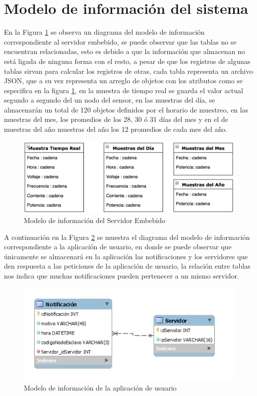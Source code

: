 \section{Modelo de información del sistema}
En la Figura \ref{fig:Base_ServidorEmbebido} se observa un diagrama del modelo de información correspondiente al servidor embebido, se puede observar que las tablas no se encuentran relacionadas, esto es debido a que la información que almacenan no está ligada de ninguna forma con el resto, a pesar de que los registros de algunas tablas sirvan para calcular los registros de otras, cada tabla representa un archivo JSON, que a su vez representa un arreglo de objetos con los atributos como se especifica en la figura \ref{fig:Base_ServidorEmbebido}, en la muestra de tiempo real se guarda el valor actual segundo a segundo del un nodo del sensor, en las muestras del día, se almacenarán un total de 120 objetos definidos por el horario de muestreo, en las muestras del mes, los promedios de los 28, 30 ó 31 días del mes y en el de muestras del año muestras del año los 12 promedios de cada mes del año.

\begin{figure}[H]
	\centering
	\includegraphics[scale=.35]{Capitulo4/images/Base_ServidorEmbebido.png}
	\caption{Modelo de información del Servidor Embebido}
	\label{fig:Base_ServidorEmbebido}
\end{figure}

A continuación en la Figura \ref{fig:Base_AplicacionUsuario} se muestra el diagrama del modelo de información correspondiente a la aplicación de usuario, en donde se puede observar que únicamente se almacenará en la aplicación las notificaciones y los servidores que den respuesta a las peticiones de la aplicación de usuario, la relación entre tablas nos indica que muchas notificaciones pueden pertenecer a un mismo servidor.

\begin{figure}[H]
	\centering
	\includegraphics[scale=1]{Capitulo4/images/Base_AplicacionUsuario.PNG}
	\caption{Modelo de información de la aplicación de usuario}
	\label{fig:Base_AplicacionUsuario}
\end{figure}